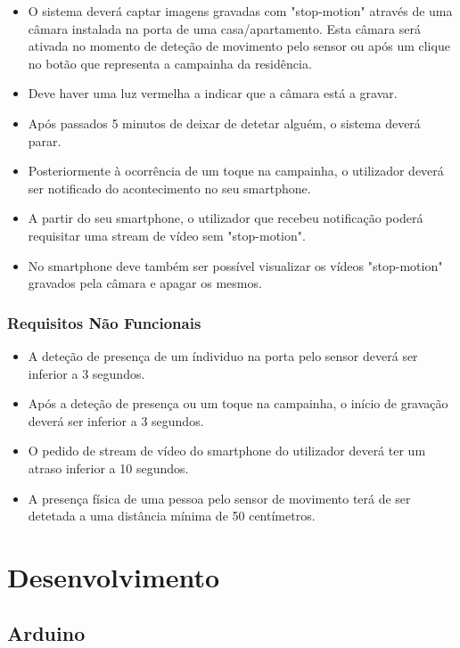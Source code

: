 \documentclass{article}
\begin{document}
\begin{itemize}
    \item O sistema deverá captar imagens gravadas com "stop-motion" através de uma câmara instalada na porta de uma casa/apartamento. Esta câmara será ativada no momento de deteção de movimento pelo sensor ou após um clique no botão que representa a campainha da residência.
    \item Deve haver uma luz vermelha a indicar que a câmara está a gravar.
    \item Após passados 5 minutos de deixar de detetar alguém, o sistema deverá parar.
    \item Posteriormente à ocorrência de um toque na campainha, o utilizador deverá ser notificado do acontecimento no seu smartphone.
    \item A partir do seu smartphone, o utilizador que recebeu notificação poderá requisitar uma stream de vídeo sem "stop-motion".
    \item No smartphone deve também ser possível visualizar os vídeos "stop-motion" gravados pela câmara e apagar os mesmos.
\end{itemize}
\vspace{2mm}

\subsubsection{Requisitos Não Funcionais}
\vspace{2mm}

\begin{itemize}
    \item A deteção de presença de um índividuo na porta pelo sensor deverá ser inferior a 3 segundos.
    \item Após a deteção de presença ou um toque na campainha, o início de gravação deverá ser inferior a 3 segundos.
    \item O pedido de stream de vídeo do smartphone do utilizador deverá ter um atraso inferior a 10 segundos.
    \item A presença física de uma pessoa pelo sensor de movimento terá de ser detetada a uma distância mínima de 50 centímetros.
\end{itemize}

\newpage
\section{Desenvolvimento}
\subsection{Arduino}
\end{document}
